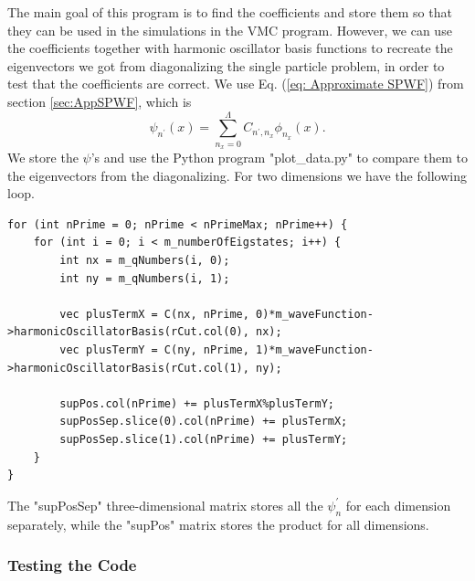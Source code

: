 \documentclass[../main.tex]{subfiles}
\begin{document}
The main goal of this program is to find the coefficients and store them so that they can be used in the simulations in the VMC program. However, we can use the coefficients together with harmonic oscillator basis functions to recreate the eigenvectors we got from diagonalizing the single particle problem, in order to test that the coefficients are correct. We use Eq. (\ref{eq: Approximate SPWF}) from section \ref{sec:AppSPWF}, which is
\begin{equation}\label{eq: Approximate SPWF2}
    \psi_{n^\prime}(x) = \sum_{n_x=0}^{\Lambda} C_{n^\prime,n_x} \phi_{n_x}(x).
\end{equation}
We store the $\psi$'s and use the Python program "plot\_data.py" to compare them to the eigenvectors from the diagonalizing. For two dimensions we have the following loop.
\lstset{language=c++}
\begin{lstlisting}[caption={}]
for (int nPrime = 0; nPrime < nPrimeMax; nPrime++) {
    for (int i = 0; i < m_numberOfEigstates; i++) {
        int nx = m_qNumbers(i, 0);
        int ny = m_qNumbers(i, 1);

        vec plusTermX = C(nx, nPrime, 0)*m_waveFunction->harmonicOscillatorBasis(rCut.col(0), nx);
        vec plusTermY = C(ny, nPrime, 1)*m_waveFunction->harmonicOscillatorBasis(rCut.col(1), ny);

        supPos.col(nPrime) += plusTermX%plusTermY;
        supPosSep.slice(0).col(nPrime) += plusTermX;
        supPosSep.slice(1).col(nPrime) += plusTermY;
    }
}
\end{lstlisting}
The "supPosSep" three-dimensional matrix stores all the $\psi_n^\prime$ for each dimension separately, while the "supPos" matrix stores the product for all dimensions.




\subsubsection{Testing the Code}
\end{document}
